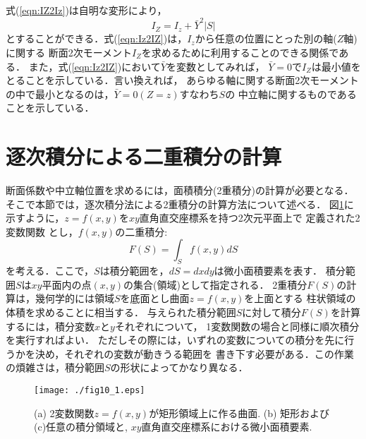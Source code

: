 ﻿\documentclass[10pt,a4j]{jbook}
\begin{document}
式(\ref{eqn:IZ2Iz})は自明な変形により，
\begin{equation}
	I_Z=I_z+\bar Y^2 \left| S \right|
	\label{eqn:Iz2IZ}
\end{equation}
とすることができる．式(\ref{eqn:Iz2IZ})は，$I_z$から任意の位置にとった別の軸($Z$軸)に関する
断面2次モーメント$I_Z$を求めるために利用することのできる関係である．
また，式(\ref{eqn:Iz2IZ})において$\bar{Y}$を変数としてみれば，
$\bar{Y}=0$で$I_Z$は最小値をとることを示している．言い換えれば，
あらゆる軸に関する断面2次モーメントの中で最小となるのは，$\bar Y=0 (Z=z)$すなわち$S$の
中立軸に関するものであることを示している．
\section{逐次積分による二重積分の計算}
断面係数や中立軸位置を求めるには，面積積分(2重積分)の計算が必要となる．
そこで本節では，逐次積分法による2重積分の計算方法について述べる．
図\ref{fig:fig10_1}に示すように，$z=f(x,y)$を$xy$直角直交座標系を持つ2次元平面上で
定義された2変数関数
とし，$f(x,y)$の二重積分:
\begin{equation}
	F(S)=\int_S f(x,y) dS
	\label{eqn:Int2D}
\end{equation}
を考える．ここで，$S$は積分範囲を，$dS=dxdy$は微小面積要素を表す．
積分範囲$S$は$xy$平面内の点$(x,y)$の集合(領域)として指定される．
2重積分$F(S)$の計算は，幾何学的には領域$S$を底面とし曲面$z=f(x,y)$を上面とする
柱状領域の体積を求めることに相当する．
与えられた積分範囲$S$に対して積分$F(S)$を計算するには，積分変数$x$と$y$それぞれについて，
1変数関数の場合と同様に順次積分を実行すればよい．
ただしその際には，いずれの変数についての積分を先に行うかを決め，それぞれの変数が動きうる範囲を
書き下す必要がある．この作業の煩雑さは，積分範囲$S$の形状によってかなり異なる．
\begin{figure}[h]
	\begin{center}
	\texttt{[image: ./fig10\_1.eps]} 
	\end{center}
	\caption{
		(a) 2変数関数$z=f(x,y)$が矩形領域上に作る曲面. 
		(b) 矩形および(c)任意の積分領域と, $xy$直角直交座標系における微小面積要素. 
	} 
	\label{fig:fig10_1}
\end{figure}
\end{document}
